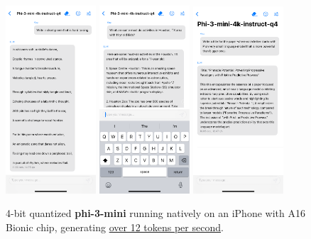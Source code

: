 \documentclass[11pt]{article}
\begin{document}
\begin{figure}
    \centering
    \includegraphics[width=0.30\textwidth]{iphone_song3.PNG}
\includegraphics[width=0.30\textwidth]{iPhone_houston3.PNG}
\includegraphics[width=0.30\textwidth]{iPhone_titlep.PNG}
    \caption{4-bit quantized \textbf{phi-3-mini} running natively on an iPhone with A16 Bionic chip, generating \uline{over 12 tokens per second}.}
    \label{fig:1}
\end{figure}
\end{document}
